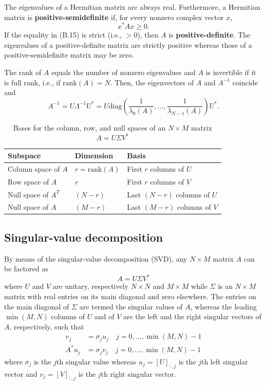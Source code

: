 \documentclass[a4paper, 12pt]{book}
\begin{document}
The eigenvalues of a Hermitian matrix are always real. Furthermore, a Hermitian matrix is \textbf{positive-semidefinite} if, for every nonzero complex vector $x$,
\begin{equation}
    x^{*}Ax \ge 0. \tag{B.15}
\end{equation}
If the equality in (B.15) is strict (i.e., $>0$), then $A$ is \textbf{positive-definite}. The eigenvalues of a positive-definite matrix are strictly positive whereas those of a positive-semidefinite matrix may be zero.

The rank of $A$ equals the number of nonzero eigenvalues and $A$ is invertible if it is full rank, i.e., if $\text{rank}(A)=N.$ Then, the eigenvectors of $A$ and $A^{-1}$ coincide and
\begin{equation}
    A^{-1} = U\Lambda^{-1}U^{*} = U \text{diag}\left(\frac{1}{\lambda_{0}(A)},...,\frac{1}{\lambda_{N-1}(A)}\right)U^{*}. \tag{B.17}
\end{equation}

\begin{table}[h]
\caption{Bases for the column, row, and null spaces of an $N \times M$ matrix $A=U\Sigma V^{*}$}
\centering
\begin{tabular}{@{}lll@{}}
\toprule
\textbf{Subspace} & \textbf{Dimension} & \textbf{Basis} \\ \midrule
Column space of $A$ & $r=\text{rank}(A)$ & First $r$ columns of $U$ \\
Row space of $A$ & $r$ & First $r$ columns of $V$ \\
Null space of $A^{T}$ & $(N-r)$ & Last $(N-r)$ columns of $U$ \\
Null space of $A$ & $(M-r)$ & Last $(M-r)$ columns of $V$ \\ \bottomrule
\end{tabular}
\end{table}

\subsection{Singular-value decomposition}
By means of the singular-value decomposition (SVD), any $N \times M$ matrix $A$ can be factored as
\begin{equation}
    A = U\Sigma V^{*} \tag{B.18}
\end{equation}
where $U$ and $V$ are unitary, respectively $N \times N$ and $M \times M$ while $\Sigma$ is an $N \times M$ matrix with real entries on its main diagonal and zero elsewhere. The entries on the main diagonal of $\Sigma$ are termed the singular values of $A$, whereas the leading $\min(M,N)$ columns of $U$ and of $V$ are the left and the right singular vectors of $A$, respectively, such that
\begin{align}
    v_{j} &= \sigma_{j}u_{j} \quad j=0,...,\min(M,N)-1 \tag{B.19} \\
    A^{*}u_{j} &= \sigma_{j}v_{j} \quad j=0,...,\min(M,N)-1 \tag{B.20}
\end{align}
where $\sigma_{j}$ is the $j$th singular value whereas $u_{j}=[U]_{:,j}$ is the $j$th left singular vector and $v_{j}=[V]_{:,j}$ is the $j$th right singular vector.
\end{document}
